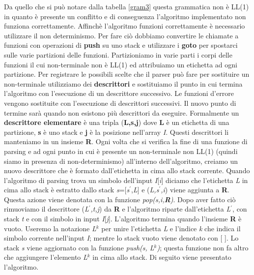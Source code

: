 Da quello che si può notare dalla tabella \ref{gram3} questa grammatica non è LL(1) in quanto è presente un conflitto e di conseguenza l'algoritmo implementato non funziona correttamente. Affinchè l'algoritmo funzioni correttamente è necessario utilizzare il non determinismo. Per fare ciò dobbiamo convertire le chiamate a funzioni con operazioni di \textbf{push} su uno stack e utilizzare i \textbf{goto} per spostarci sulle varie partizioni delle funzioni. Partizioniamo in varie parti i corpi delle funzioni il cui non-terminale non è LL(1) ed attribuiamo un etichetta ad ogni partizione. Per registrare le possibili scelte che il parser può fare per sostituire un non-terminale utilizziamo dei \textbf{descrittori} e sostituiamo il punto in cui termina l'algoritmo con l'esecuzione di un descrittore successivo. Le funzioni d'errore vengono sostituite con l'esecuzione di descrittori successivi. Il nuovo punto di termine sarà quando non esistono più descrittori da eseguire. Formalmente un \textbf{descrittore elementare} è una tripla (\textbf{L,s,j}) dove \textbf{L} è un etichetta di una partizione, \textbf{s} è uno stack e \textbf{j} è la posizione nell'array \textit{I}. Questi descrittori li manteniamo in un insieme \textbf{R}. Ogni volta che si verifica la fine di una funzione di parsing e ad ogni punto in cui è presente un non-terminale non LL(1) (quindi siamo in presenza di non-determinismo) all'interno dell'algoritmo, creiamo un nuovo descrittore che è formato dall'etichetta in cima allo stack corrente. Quando l'algoritmo di parsing trova un simbolo dell'input \textit{I}[\textit{i}] diciamo che l'etichetta \textit{L} in cima allo stack è estratto dallo stack \textit{s}=[\textit{s$^{'}$},\textit{L}] e (\textit{L,s$^{'}$,i}) viene aggiunta a \textbf{R}. Questa azione viene denotata con la funzione \textit{pop(s,i,\textbf{R})}. Dopo aver fatto ciò rimuoviamo il descrittore (\textit{L$^{'}$,t,j}) da \textbf{R} e l'algoritmo riparte dall'etichetta \textit{L$^{'}$}, con stack \textit{t} e con il simbolo in input \textit{I}[\textit{j}]. L'algoritmo termina quando l'insieme \textbf{R} è vuoto. Useremo la notazione \textit{L}$^{k}$ per unire l'etichetta \textit{L} e l'indice \textit{k} che indica il simbolo corrente nell'input \textit{I}; mentre lo stack vuoto viene denotato con [ ]. Lo stack \textit{s} viene aggiornato con la funzione \textit{push(s, L$^{k}$)}; questa funzione non fa altro che aggiungere  l'elemento \textit{L}$^{k}$ in cima allo stack. Di seguito viene presentato l'algoritmo.\par
\vspace{0.5cm}
